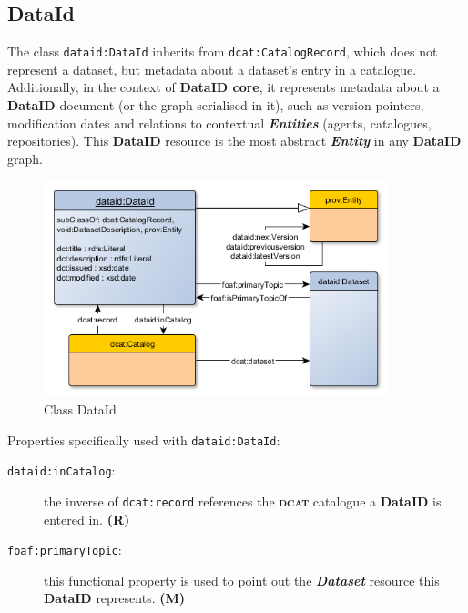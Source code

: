\documentclass[a4paper,english,twoside,BCOR1.5cm,headsepline,DIV12,appendixprefix,final,12pt]{scrbook}
\newcommand{\dataid}{{\ttfamily\bfseries DataID}\xspace}
\newcommand{\core}{{\ttfamily\bfseries DataID core}\xspace}
\newcommand{\dcat}{{\scshape\bfseries dcat}\xspace}
\newcommand{\prop}[1]{{{\texttt{#1}}}}
\newcommand{\important}[1]{\textbf{\textit{#1}}}
\begin{document}
\subsection{DataId} 
\label{sec:coredataid}
The class \prop{dataid:DataId} inherits from \prop{dcat:CatalogRecord}, which does not represent a dataset, but metadata about a dataset's entry in a catalogue. Additionally, in the context of \core, it represents metadata about a \dataid document (or the graph serialised in it), such as version pointers, modification dates and relations to contextual \important{Entities} (agents, catalogues, repositories). This \dataid resource is the most abstract \important{Entity} in any \dataid graph. 

\begin{figure}[!htbp]
\centering
  \includegraphics[width=10cm]{images/ClassDataId.png}
  \caption{Class DataId}
  \label{fig:example}
\end{figure}

Properties specifically used with \prop{dataid:DataId}:
\begin{description}
\item[\prop{dataid:inCatalog}:] the inverse of \prop{dcat:record} references the \dcat catalogue a \dataid is entered in. \textbf{(R)}
\item[\prop{foaf:primaryTopic}:] this functional property is used to point out the \important{Dataset} resource this \dataid represents. \textbf{(M)}
\end{description}
\end{document}
